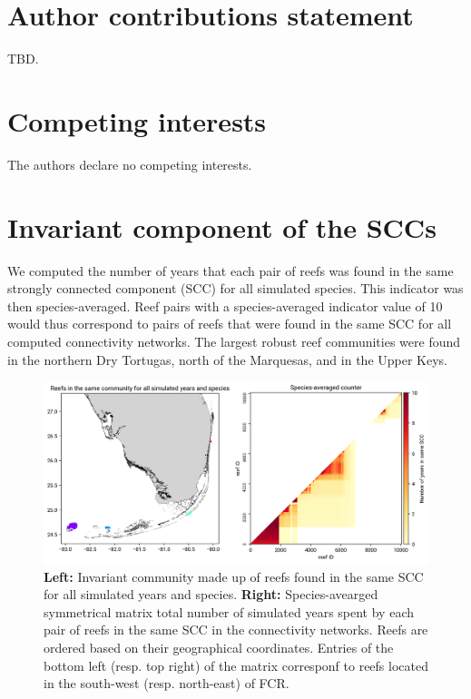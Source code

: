 \documentclass[preprint,12pt,authoryear]{elsarticle}
\begin{document}
	\section*{Author contributions statement}
	
	TBD.
	
	\section*{Competing interests}
	
	The authors declare no competing interests.
	
	
	
	
	\newpage
	
	
	\appendix
	
	\section{Invariant component of the SCCs}
	
	We computed the number of years that each pair of reefs was found in the same strongly connected component (SCC) for all simulated species. This indicator was then species-averaged. Reef pairs with a species-averaged indicator value of 10 would thus correspond to pairs of reefs that were found in the same SCC for all computed connectivity networks. The largest robust reef communities were found in the northern Dry Tortugas, north of the Marquesas, and in the Upper Keys.
	
	\begin{figure}[h!]
		\centering
		\includegraphics[width=\textwidth]{figures/mean_counter.png}
		\caption{\textbf{Left:} Invariant community made up of reefs found in the same SCC for all simulated years and species. \textbf{Right:} Species-avearged symmetrical matrix total number of simulated years spent by each pair of reefs in the same SCC in the connectivity networks. Reefs are ordered based on their geographical coordinates. Entries of the bottom left (resp. top right) of the matrix corresponf to reefs located in the south-west (resp. north-east) of FCR.}\label{fig:mean_counter}
	\end{figure}
	
\end{document}

